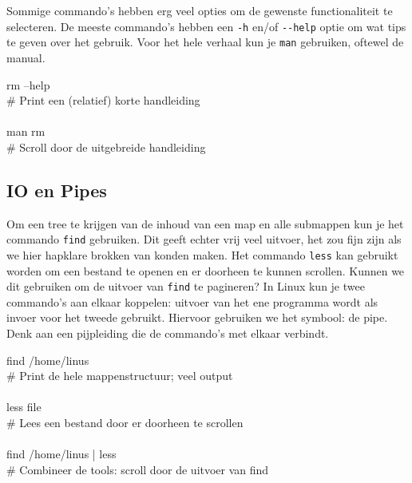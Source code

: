 Sommige commando's hebben erg veel opties om de gewenste functionaliteit te selecteren. De meeste commando's hebben een \texttt{-h} en/of \texttt{-\/-help} optie om wat tips te geven over het gebruik. Voor het hele verhaal kun je \texttt{man} gebruiken, oftewel de manual.

\begin{bash}
\userprompt[~] rm --help\\
\# Print een (relatief) korte handleiding\\
\\
\userprompt[~] man rm\\
\# Scroll door de uitgebreide handleiding\\
\end{bash}

\subsection{IO en Pipes}\label{io-en-pipes}

Om een tree te krijgen van de inhoud van een map en alle submappen kun je het commando \texttt{find} gebruiken. Dit geeft echter vrij veel uitvoer, het zou fijn zijn als we hier hapklare brokken van konden maken. Het commando \texttt{less} kan gebruikt worden om een bestand te openen en er doorheen te kunnen scrollen. Kunnen we dit gebruiken om de uitvoer van \texttt{find} te pagineren? In Linux kun je twee commando's aan elkaar koppelen: uitvoer van het ene programma wordt als invoer voor het tweede gebruikt. Hiervoor gebruiken we het \texttt{\textbar{}} symbool: de pipe. Denk aan een pijpleiding die de commando's met elkaar verbindt.

\begin{bash}
\userprompt[~] find /home/linus\\
\# Print de hele mappenstructuur; veel output\\
\\
\userprompt[~] less file\\
\# Lees een bestand door er doorheen te scrollen\\
\\
\userprompt[~] find /home/linus | less\\
\# Combineer de tools: scroll door de uitvoer van find\\
\end{bash}


